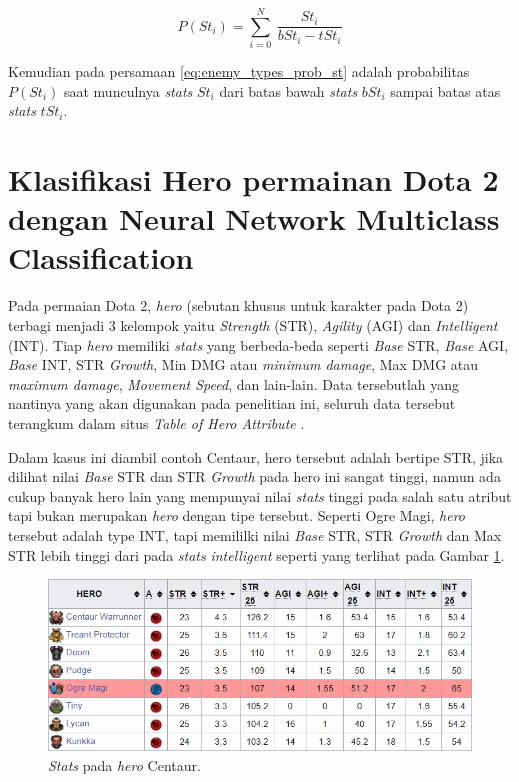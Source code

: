 \begin{equation}\label{eq:enemy_types_prob_st}
P(St_{i}) = \sum_{i=0}^{N}\ \frac{St_{i}}{bSt_{i} - tSt_{i}}
\end{equation}

Kemudian pada persamaan \ref{eq:enemy_types_prob_st} adalah probabilitas $P(St_{i})$ saat munculnya \textit{stats} $St_{i}$ dari batas bawah \textit{stats} $bSt_{i}$ sampai batas atas \textit{stats} $tSt_{i}$.

\section{Klasifikasi Hero permainan Dota 2 dengan Neural Network Multiclass Classification}
\label{sec:sec3_dota2_method}
\vspace{1ex}

Pada permaian Dota 2, \textit{hero} (sebutan khusus untuk karakter pada Dota 2) terbagi menjadi 3 kelompok yaitu \textit{Strength} (STR), \textit{Agility} (AGI) dan \textit{Intelligent} (INT). Tiap \textit{hero} memiliki \textit{stats} yang berbeda-beda seperti \textit{Base} STR, \textit{Base} AGI, \textit{Base} INT, STR \textit{Growth}, Min DMG atau \textit{minimum damage}, Max DMG atau \textit{maximum damage}, \textit{Movement Speed}, dan lain-lain. Data tersebutlah yang nantinya yang akan digunakan pada penelitian ini, seluruh data tersebut terangkum dalam situs \textit{Table of Hero Attribute} \citep{dota2020}.
\vspace{1ex}

Dalam kasus ini diambil contoh Centaur, hero tersebut adalah bertipe STR, jika dilihat nilai \textit{Base} STR dan STR \textit{Growth} pada hero ini sangat tinggi, namun ada cukup banyak hero lain yang mempunyai nilai \textit{stats} tinggi pada salah satu atribut tapi bukan merupakan \textit{hero} dengan tipe tersebut. Seperti Ogre Magi, \textit{hero} tersebut adalah type INT, tapi memililki nilai \textit{Base} STR, STR \textit{Growth} dan Max STR lebih tinggi dari pada \textit{stats} \textit{intelligent} seperti yang terlihat pada Gambar \ref{fig:centa}. 
\vspace{1ex}

\begin{figure} [!h] \centering
	\includegraphics[scale=0.53]{img/centa.jpg}
	\caption{\textit{Stats} pada \textit{hero} Centaur.}
	\label{fig:centa}
\end{figure}

